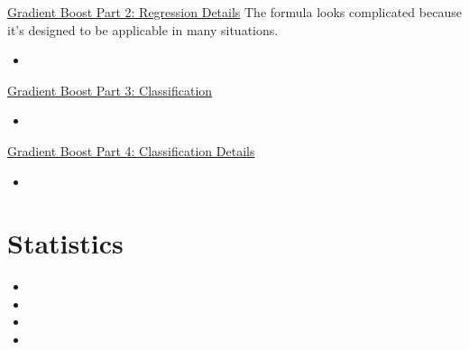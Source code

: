 \documentclass[12pt, titlepage, french]{report}
\begin{document}
\begin{YTB_SUMM_AUTO_NUMB}[label = {SQ-Boo-Reg-Det}]{\href{https://www.youtube.com/watch?v=2xudPOBz-vs&feature=youtu.be}{Gradient Boost Part 2: Regression Details}}
The formula looks complicated because it's designed to be applicable in many situations.
\begin{itemize}[leftmargin = *]
	\item	
\end{itemize}
\end{YTB_SUMM_AUTO_NUMB}

\begin{YTB_SUMM_AUTO_NUMB}[label = {SQ-Boo-Class-Idea}]{\href{https://www.youtube.com/watch?v=jxuNLH5dXCs&feature=youtu.be}{Gradient Boost Part 3: Classification}}

\begin{itemize}[leftmargin = *]
	\item	
\end{itemize}
\end{YTB_SUMM_AUTO_NUMB}

\begin{YTB_SUMM_AUTO_NUMB}[label = {SQ-Boo-Class-Det}]{\href{https://www.youtube.com/watch?v=StWY5QWMXCw&feature=youtu.be}{Gradient Boost Part 4: Classification Details}}

\begin{itemize}[leftmargin = *]
	\item	
\end{itemize}
\end{YTB_SUMM_AUTO_NUMB}

\pagebreak
\section{Statistics}
\begin{YTB_vids}
\begin{itemize}
	\item	{}
	\item	{}
	\item	{}
	\item	{}
\end{itemize}
\end{YTB_vids}
\end{document}

